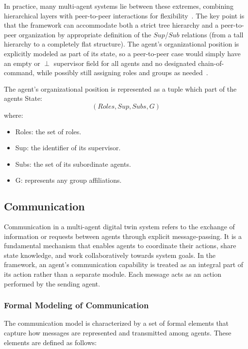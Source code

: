 In practice, many multi-agent systems lie between these extremes, combining hierarchical layers with peer-to-peer interactions for flexibility~\cite{Moore2025Taxonomy}. The key point is that the framework can accommodate both a strict tree hierarchy and a peer-to-peer organization by appropriate definition of the $Sup$/$Sub$ relations (from a tall hierarchy to a completely flat structure). The agent’s organizational position is explicitly modeled as part of its state, so a peer-to-peer case would simply have an empty or $\perp$ supervisor field for all agents and no designated chain-of-command, while possibly still assigning roles and groups as needed~\cite{Moore2025Taxonomy}.

The agent’s organizational position is represented as a tuple which part of the agents State:
 \begin{equation*}
    (Roles,Sup,Subs,G)
 \end{equation*}
where:
\begin{itemize}
    \item Roles: the set of roles.
    \item Sup: the identifier of its supervisor.
    \item Subs: the set of its subordinate agents.
    \item G: represents any group affiliations.
\end{itemize}




\subsection{Communication}
Communication in a multi-agent digital twin system refers to the exchange of information or requests between agents through explicit message-passing. It is a fundamental mechanism that enables agents to coordinate their actions, share state knowledge, and work collaboratively towards system goals. In the framework, an agent’s communication capability is treated as an integral part of its action rather than a separate module. Each message acts as an action performed by the sending agent. 




\subsubsection{Formal Modeling of Communication}
The communication model is characterized by a set of formal elements that capture how messages are represented and transmitted among agents. These elements are defined as follows:

